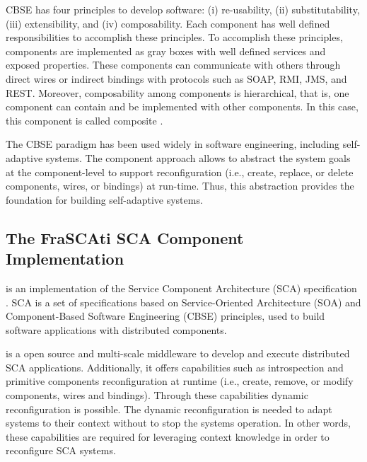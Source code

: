CBSE has four principles to develop software: (i) re-usability, (ii) substitutability, (iii) extensibility, and (iv) composability. Each component has well defined responsibilities to accomplish these principles. To accomplish these principles, components are implemented as gray boxes with well defined services and exposed properties. These components can communicate with others through direct wires or indirect bindings with protocols such as SOAP, RMI, JMS, and REST.  Moreover, composability among components is hierarchical, that is, one component can contain and be implemented with other components. In this case, this component is called composite \cite{tamura:2012:QoS-CARE}.

The CBSE paradigm has been used widely in software engineering, including self-adaptive systems. The component approach allows to abstract the system goals at the component-level to support reconfiguration (i.e.,  create, replace, or delete components, wires, or bindings) at run-time. Thus, this abstraction provides the foundation for building self-adaptive systems.


\subsection {The FraSCAti SCA Component Implementation}
\frascati{} is an implementation of the  Service Component Architecture (SCA) specification \cite{seinturier2012component}. SCA is a set of specifications based on Service-Oriented Architecture (SOA) and Component-Based Software Engineering (CBSE) principles, used to build software applications with distributed components. 

\frascati{} is a open source and multi-scale middleware to develop and execute distributed SCA applications. Additionally, it offers capabilities such as introspection and primitive components reconfiguration at runtime (i.e., create, remove, or modify components, wires and bindings). Through these capabilities dynamic reconfiguration is possible. The dynamic reconfiguration is needed to adapt systems to their context without to stop the systems operation.  In other words, these capabilities are required for leveraging context knowledge in order to reconfigure SCA systems. 

